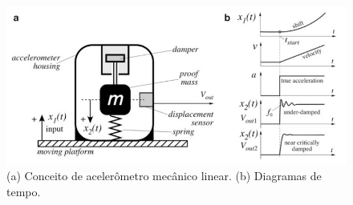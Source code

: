

\begin{figure}[ht]
    \centering
    \caption{(a) Conceito de acelerômetro mecânico linear. (b) Diagramas de tempo.}
    \begin{center}
        \includegraphics[width=1\textwidth]{img/print_acelerometro_conceito.png}
    \end{center}
    \vspace{-0.5cm}
    

    
    \label{fig:ModernSensors}
\end{figure}